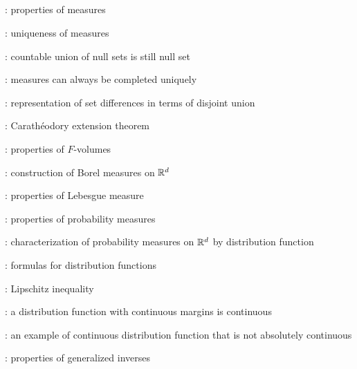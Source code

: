 \subsection*{}
\item {}: properties of measures
\item {}: uniqueness of measures
\item {}: countable union of null sets is still null set
\item {}: measures can always be completed uniquely
\item {}: representation of set differences in terms of disjoint union
\item {}: Carath\'eodory extension theorem
\item {}: properties of \(F\)-volumes
\item {}: construction of Borel measures on \(\mathbb{R}^d\)
\item {}: properties of Lebesgue measure
\item {}: properties of probability measures
\item {}: characterization of probability
measures on \(\mathbb{R}^d\) by distribution function
\item {}: formulas for distribution functions
\item {}: Lipschitz inequality
\item {}: a distribution function with continuous margins is continuous
\item {}: an example of continuous distribution function that is not absolutely continuous
\item {}: properties of generalized inverses

